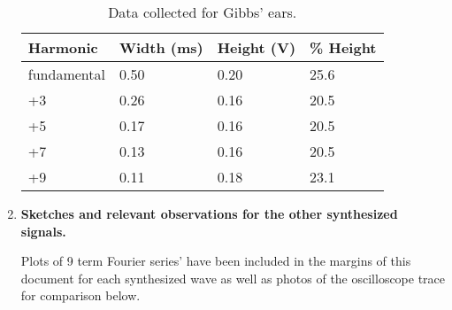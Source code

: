 \begin{enumerate}[resume]
\begin{table}[ht]
\center
\begin{tabular}{|l|l|l|l|}
\hline
Harmonic    & Width (ms) & Height (V) & \% Height \\ \hline
fundamental & 0.50       & 0.20       & 25.6      \\ \hline
+3          & 0.26       & 0.16       & 20.5      \\ \hline
+5          & 0.17       & 0.16       & 20.5      \\ \hline
+7          & 0.13       & 0.16       & 20.5      \\ \hline
+9          & 0.11       & 0.18       & 23.1      \\ \hline
\end{tabular}
\caption{Data collected for Gibbs' ears.}
\label{tab:fscg1}
\end{table}

\item {\bf Sketches and relevant observations for the other synthesized signals.}\newline

Plots of 9 term Fourier series' have been included in the margins of this document for each synthesized wave as well as photos of the oscilloscope trace for comparison below.


\end{enumerate}


